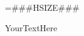 \documentclass[preview]{standalone}
\begin{document}
\hsize=###HSIZE###

YourTextHere
\end{document}
